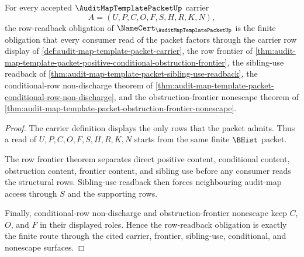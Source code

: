 \begin{theorem}
\label{thm:audit-map-template-packet-row-readback-obligation}
For every accepted $\AuditMapTemplatePacketUp$ carrier
$$
A=(U,P,C,O,F,S,H,R,K,N),
$$
the row-readback obligation of $\NameCert_{\AuditMapTemplatePacketUp}$ is the finite obligation that every consumer read of the packet factors through the carrier row display of \autoref{def:audit-map-template-packet-carrier}, the row frontier of \autoref{thm:audit-map-template-packet-positive-conditional-obstruction-frontier}, the sibling-use readback of \autoref{thm:audit-map-template-packet-sibling-use-readback}, the conditional-row non-discharge theorem of \autoref{thm:audit-map-template-packet-conditional-row-non-discharge}, and the obstruction-frontier nonescape theorem of \autoref{thm:audit-map-template-packet-obstruction-frontier-nonescape}.
\end{theorem}
\begin{proof}
The carrier definition displays the only rows that the packet admits. Thus a read of $U,P,C,O,F,S,H,R,K,N$ starts from the same finite $\BHist$ packet.

The row frontier theorem separates direct positive content, conditional content, obstruction content, frontier content, and sibling use before any consumer reads the structural rows. Sibling-use readback then forces neighbouring audit-map access through $S$ and the supporting rows.

Finally, conditional-row non-discharge and obstruction-frontier nonescape keep $C$, $O$, and $F$ in their displayed roles. Hence the row-readback obligation is exactly the finite route through the cited carrier, frontier, sibling-use, conditional, and nonescape surfaces.
\end{proof}

